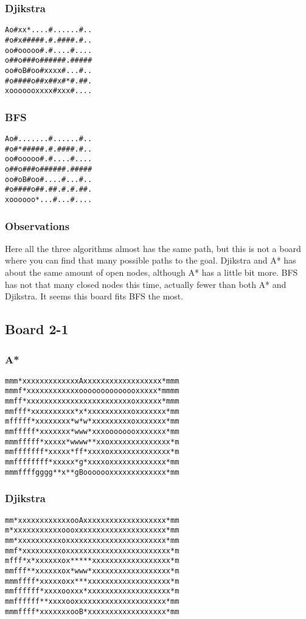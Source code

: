 \documentclass[11pt,a4paper]{article}
\begin{document}
\subsubsection*{Djikstra}
\begin{lstlisting}
Ao#xx*....#......#..
#o#x#####.#.####.#..
oo#ooooo#.#....#....
o##o###o######.#####
oo#oB#oo#xxxx#...#..
#o####o##x##x#*#.##.
xooooooxxxx#xxx#....
\end{lstlisting}

\subsubsection*{BFS}
\begin{lstlisting}
Ao#.......#......#..
#o#*#####.#.####.#..
oo#ooooo#.#....#....
o##o###o######.#####
oo#oB#oo#....#...#..
#o####o##.##.#.#.##.
xoooooo*...#...#....
\end{lstlisting}
\subsubsection*{Observations}
Here all the three algorithms almost has the same path, but this is not a board where you can find that many possible paths to the goal. Djikstra and A* has about the same amount of open nodes, although A* has a little bit more. BFS has not that many closed nodes this time, actually fewer than both A* and Djikstra. It seems this board fits BFS the most.

\subsection*{Board 2-1}
\subsubsection*{A*}
\begin{lstlisting}
mmm*xxxxxxxxxxxxxAxxxxxxxxxxxxxxxxxx*mmm
mmmf*xxxxxxxxxxxxoooooooooooooxxxxx*mmmm
mmff*xxxxxxxxxxxxxxxxxxxxxxxxoxxxxxx*mmm
mmfff*xxxxxxxxxx*x*xxxxxxxxxxoxxxxxxx*mm
mfffff*xxxxxxxx*w*w*xxxxxxxxxoxxxxxxx*mm
mmfffff*xxxxxxx*www*xxxoooooooxxxxxxx*mm
mmmfffff*xxxxx*wwww**xxoxxxxxxxxxxxxxx*m
mmfffffff*xxxxx*ff*xxxxoxxxxxxxxxxxxxx*m
mmffffffff*xxxxx*g*xxxxoxxxxxxxxxxxxx*mm
mmmffffgggg**x**gBooooooxxxxxxxxxxxxx*mm
\end{lstlisting}

\subsubsection*{Djikstra}
\begin{lstlisting}
mm*xxxxxxxxxxxxooAxxxxxxxxxxxxxxxxxxx*mm
m*xxxxxxxxxxxoooxxxxxxxxxxxxxxxxxxxxx*mm
mm*xxxxxxxxxxoxxxxxxxxxxxxxxxxxxxxxxx*mm
mmf*xxxxxxxxxoxxxxxxxxxxxxxxxxxxxxxxxx*m
mfff*x*xxxxxxox*****xxxxxxxxxxxxxxxxxx*m
mmfff**xxxxxxox*www*xxxxxxxxxxxxxxxxxx*m
mmmffff*xxxxxoxx***xxxxxxxxxxxxxxxxxxx*m
mmffffff*xxxxooxxx*xxxxxxxxxxxxxxxxxxx*m
mmffffff**xxxxooxxxxxxxxxxxxxxxxxxxxx*mm
mmmffff*xxxxxxxooB*xxxxxxxxxxxxxxxxxx*mm
\end{lstlisting}
\end{document}
